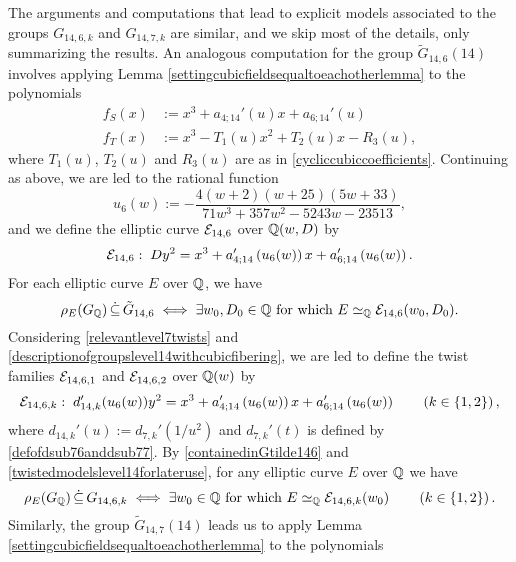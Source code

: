 The arguments and computations that lead to explicit models associated to the groups $G_{14,6,k}$ and $G_{14,7,k}$ are similar, and we skip most of the details, only summarizing the results. An analogous computation for the group $\tilde{G}_{14,6}(14)$ involves applying Lemma \ref{settingcubicfieldsequaltoeachotherlemma} to the polynomials
\[
\begin{split}
f_S(x) &:= x^3 + a_{4;14}'(u)x + a_{6;14}'(u) \\
f_T(x) &:= x^3 - T_1(u) x^2 + T_2(u) x - R_3(u),
\end{split}
\]
where $T_1(u)$, $T_2(u)$ and $R_3(u)$ are as in \eqref{cycliccubiccoefficients}. Continuing as above, we are led to the rational function
\begin{equation} \label{defofusub6}
u_6(w) := - \frac{4(w+2)(w+25)(5w+33)}{71w^3 + 357w^2 - 5243w - 23513},
\end{equation}
and we define the elliptic curve $\mathcal{E}_{14,6}$ over $\mathbb{Q}(w,D)$ by
\begin{equation} \label{defofmcEsub146}
\mathcal{E}_{14,6} : \; D y^2 = x^3 + a_{4;14}'\left( u_6(w) \right) x + a_{6;14}'\left( u_6(w) \right).
\end{equation}
For each elliptic curve $E$ over $\mathbb{Q}$, we have
\begin{equation} \label{containedinGtilde146}
\rho_{E}(G_{\mathbb{Q}}) \, \dot\subseteq \, \tilde{G}_{14,6} \; \Longleftrightarrow \; \exists w_0, D_0 \in \mathbb{Q} \text{ for which } E \simeq_{\mathbb{Q}} \mathcal{E}_{14,6}(w_0,D_0).
\end{equation}
Considering \eqref{relevantlevel7twists} and \eqref{descriptionofgroupslevel14withcubicfibering}, we are led to define the twist families 
$\mathcal{E}_{14,6,1}$ and $\mathcal{E}_{14,6,2}$ over $\mathbb{Q}(w)$ by
\begin{equation} \label{defofmcE1461and2}
\mathcal{E}_{14,6,k} : \; d_{14,k}'(u_6(w)) y^2 = x^3 + a_{4;14}'\left( u_6(w) \right) x + a_{6;14}'\left( u_6(w) \right) \quad\quad \left( k \in \{ 1, 2 \} \right),
\end{equation}
where $d_{14,k}'(u) := d_{7,k}'(1/u^2)$ and $d_{7,k}'(t)$ is defined by \eqref{defofdsub76anddsub77}. By \eqref{containedinGtilde146} and \eqref{twistedmodelslevel14forlateruse}, for any elliptic curve $E$ over $\mathbb{Q}$ we have
\[
\rho_{E}(G_{\mathbb{Q}}) \, \dot\subseteq \, G_{14,6,k} \; \Longleftrightarrow \; \exists w_0 \in \mathbb{Q} \text{ for which } E \simeq_{\mathbb{Q}} \mathcal{E}_{14,6,k}(w_0) \quad\quad \left( k \in \{ 1, 2 \} \right).
\]
Similarly, the group $\tilde{G}_{14,7}(14)$ leads us to apply Lemma \ref{settingcubicfieldsequaltoeachotherlemma} to the polynomials
